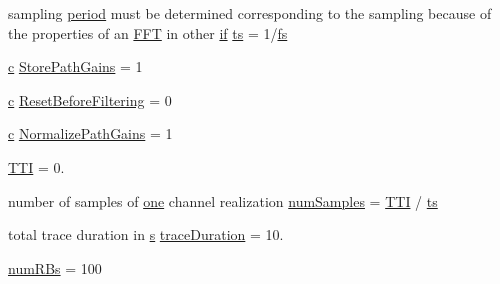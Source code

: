 \begin{DoxyCompactItemize}
\item 
sampling \hyperlink{mmwave_2model_2fading-traces_2fading__trace__generator_8m_ae10c944bf9f3fba2686a5885ecc192d7}{period} must be determined corresponding to the sampling because of the properties of an \hyperlink{mmwave_2model_2fading-traces_2fading__trace__generator_8m_ac4962f4e70dbd9d6f4994fd9698b6932}{F\+FT} in other \hyperlink{loss__OH__large__cities__urban_8m_ac77b6cfa3068152087725fe54b4ae8c8}{if} \hyperlink{mmwave_2model_2fading-traces_2fading__trace__generator_8m_ada841f58d7be618bfbc76c87e7d44086}{ts} = 1/\hyperlink{mmwave_2model_2fading-traces_2fading__trace__generator_8m_a828bad5070b721e1b73311b8607e5d25}{fs}
\item 
\hyperlink{mmwave_2model_2fading-traces_2fading__trace__generator_8m_ae0323a9039add2978bf5b49550572c7c}{c} \hyperlink{mmwave_2model_2fading-traces_2fading__trace__generator_8m_a9dc3a71c2ded9325a6ff7ff3ba9ace9f}{Store\+Path\+Gains} = 1
\item 
\hyperlink{mmwave_2model_2fading-traces_2fading__trace__generator_8m_ae0323a9039add2978bf5b49550572c7c}{c} \hyperlink{mmwave_2model_2fading-traces_2fading__trace__generator_8m_a3b6959ba3648790623378c52c9cc974a}{Reset\+Before\+Filtering} = 0
\item 
\hyperlink{mmwave_2model_2fading-traces_2fading__trace__generator_8m_ae0323a9039add2978bf5b49550572c7c}{c} \hyperlink{mmwave_2model_2fading-traces_2fading__trace__generator_8m_a361a4eebc8493db68881255cbd5c8fc3}{Normalize\+Path\+Gains} = 1
\item 
\hyperlink{mmwave_2model_2fading-traces_2fading__trace__generator_8m_ac1869da1923b6ac2fd774dc4fe76bf1e}{T\+TI} = 0.
\item 
number of samples of \hyperlink{visualizer-ideas_8txt_a0a84c3fa82a58d60404416317320714e}{one} channel realization \hyperlink{mmwave_2model_2fading-traces_2fading__trace__generator_8m_ac1c1060eccee3f757a797f32214e7725}{num\+Samples} = \hyperlink{mmwave_2model_2fading-traces_2fading__trace__generator_8m_ac1869da1923b6ac2fd774dc4fe76bf1e}{T\+TI} / \hyperlink{mmwave_2model_2fading-traces_2fading__trace__generator_8m_ada841f58d7be618bfbc76c87e7d44086}{ts}
\item 
total trace duration in \hyperlink{generate__test__data__lte__sinr_8m_ad83eeb3a142285d1243a08c6b7026df8}{s} \hyperlink{mmwave_2model_2fading-traces_2fading__trace__generator_8m_a0c1585818ec8cef3da5de969db327075}{trace\+Duration} = 10.
\item 
\hyperlink{mmwave_2model_2fading-traces_2fading__trace__generator_8m_a887ee7a54247d19e5e93955a7b9663ae}{num\+R\+Bs} = 100

\end{DoxyCompactItemize}
